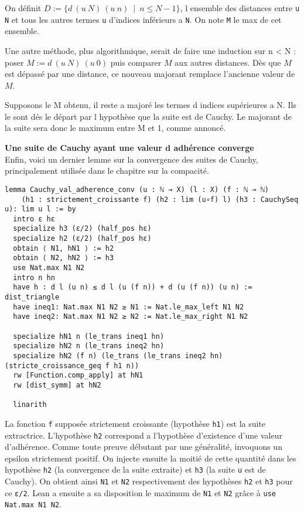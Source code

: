 \documentclass[a4paper, 12pt]{article}
\newcommand{\lean}[1]{\texttt{#1}}
\begin{document}
On définit $D := \{d\ (u\ N)\ (u\ n)\ \mid\ n \leq N-1\}$, l ensemble des distances entre \lean{u N} et tous les autres termes \lean{u} d'indices inférieurs a \lean{N}. On note \lean{M} le max de cet ensemble.

Une autre méthode, plus algorithmique, serait de faire une induction sur n < N : poser $M := d\ (u\ N)\ (u\ 0)$ puis comparer $M$ aux autres distances. Dès que $M$ est dépassé par une distance, ce nouveau majorant remplace l'ancienne valeur de $M$.

Supposons le M obtenu, il reste a majoré les termes d indices supérieures a N. Ils le sont dés le départ par l hypothèse que la suite est de Cauchy.
Le majorant de la suite sera donc le maximum entre M et 1, comme annoncé.


\textbf{Une suite de Cauchy ayant une valeur d adhérence converge}\\

Enfin, voici un dernier lemme sur la convergence des suites de Cauchy, principalement utilisée dans le chapitre sur la compacité.

\begin{verbatim}
lemma Cauchy_val_adherence_conv (u : ℕ → X) (l : X) (f : ℕ → ℕ)
    (h1 : strictement_croissante f) (h2 : lim (u∘f) l) (h3 : CauchySeq u): lim u l := by
  intro ε hε
  specialize h3 (ε/2) (half_pos hε)
  specialize h2 (ε/2) (half_pos hε)
  obtain ⟨ N1, hN1 ⟩ := h2
  obtain ⟨ N2, hN2 ⟩ := h3
  use Nat.max N1 N2
  intro n hn
  have h : d l (u n) ≤ d l (u (f n)) + d (u (f n)) (u n) := dist_triangle
  have ineq1: Nat.max N1 N2 ≥ N1 := Nat.le_max_left N1 N2
  have ineq2: Nat.max N1 N2 ≥ N2 := Nat.le_max_right N1 N2

  specialize hN1 n (le_trans ineq1 hn)
  specialize hN2 n (le_trans ineq2 hn)
  specialize hN2 (f n) (le_trans (le_trans ineq2 hn) (stricte_croissance_geq f h1 n))
  rw [Function.comp_apply] at hN1
  rw [dist_symm] at hN2

  linarith
\end{verbatim}

La fonction \lean{f} supposée strictement croissante (hypothèse \lean{h1}) est la suite extractrice. L'hypothèse \lean{h2} correspond a l'hypothèse d'existence d'une valeur d'adhérence. Comme toute preuve débutant par une généralité, invoquons un epsilon strictement positif. On injecte ensuite la moitié de cette quantité dans les hypothèse \lean{h2} (la convergence de la suite extraite) et \lean{h3} (la suite \lean{u} est de Cauchy).
On obtient ainsi \lean{N1} et \lean{N2} respectivement des hypothèses \lean{h2} et \lean{h3} pour ce \lean{ε/2}. Lean a ensuite a sa disposition le maximum de \lean{N1} et \lean{N2} grâce à \lean{use Nat.max N1 N2}.
\end{document}

